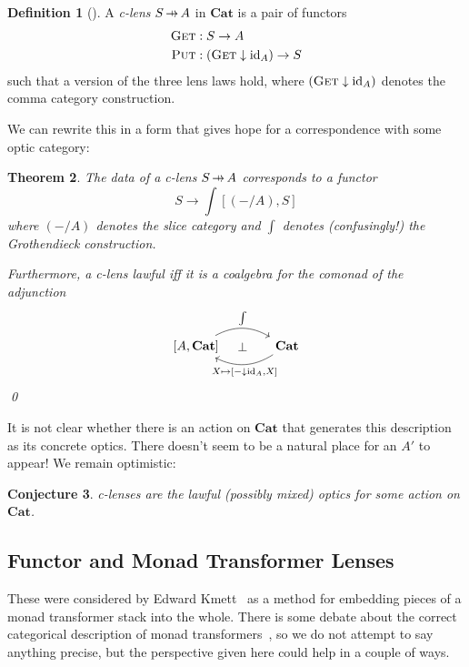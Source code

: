\documentclass[11pt,letterpaper]{article}
\theoremstyle{plain}
\newtheorem{theorem}{Theorem}[subsection]
\newtheorem{conjecture}[theorem]{Conjecture}
\theoremstyle{definition}
\newtheorem{definition}[theorem]{Definition}
\newcommand{\Cat}{\mathbf{Cat}}
\newcommand{\id}{\mathrm{id}}
\newcommand{\fget}{\textsc{Get}}
\newcommand{\fput}{\textsc{Put}}
\newcommand{\hto}{\ensuremath{\,\mathaccent\shortmid\rightarrow\,}}
\newcommand{\todo}[1]{\textcolor{red}{\small #1}}
\begin{document}
\begin{definition}[{\cite[Definition 4.1]{LensesFibrationsAndUniversalTranslations}}]
A \emph{c-lens} $S \hto A$ in $\Cat$ is a pair of functors
\begin{align*}
\fget &: S \to A \\
\fput &: (\fget \downarrow \id_{A}) \to S
\end{align*}
such that a version of the three lens laws hold, where $(\fget \downarrow \id_{A})$ denotes the comma category construction.
\end{definition}

We can rewrite this in a form that gives hope for a correspondence with some optic category:

\begin{theorem}
The data of a c-lens $S \hto A$ corresponds to a functor \[ S \to \int [(- / A), S] \] where $(-/A)$ denotes the slice category and $\int$ denotes (confusingly!) the Grothendieck construction.

Furthermore, a c-lens lawful iff it is a coalgebra for the comonad of the adjunction
\[
\begin{tikzcd}[column sep = large]
{[A, \Cat]} \ar[r, bend left, "\int"] \ar[r, phantom, "\bot" pos = 0.4] & \Cat \ar[l, bend left, "{X \mapsto [- \downarrow \id_A, X]}" below]
\end{tikzcd}
\]
\qed
\end{theorem}

It is not clear whether there is an action on $\Cat$ that generates this description as its concrete optics. There doesn't seem to be a natural place for an $A'$ to appear! We remain optimistic:

\begin{conjecture}
c-lenses are the lawful (possibly mixed) optics for some action on $\Cat$.
\end{conjecture}

\subsection{Functor and Monad Transformer Lenses}
These were considered by Edward Kmett~\cite{MonadTransformerLensesTalk}  as a method for embedding pieces of a monad transformer stack into the whole. There is some debate about the correct categorical description of monad transformers~\cite{MonadTransformersAsMonoidTransformers, CalculatingMonadTransformersCategoryTheory}, so we do not attempt to say anything precise, but the perspective given here could help in a couple of ways.
\end{document}
